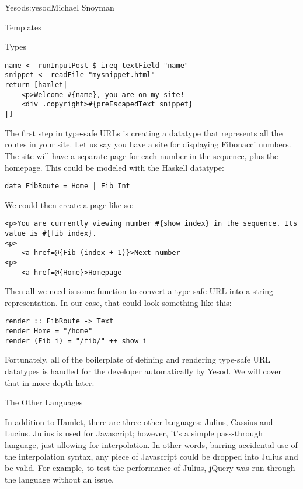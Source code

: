 \begin{aosachapter}{Yesod}{s:yesod}{Michael Snoyman}
\begin{aosasect1}{Templates}
\begin{aosasect2}{Types}
\begin{verbatim}
name <- runInputPost $ ireq textField "name"
snippet <- readFile "mysnippet.html"
return [hamlet|
    <p>Welcome #{name}, you are on my site!
    <div .copyright>#{preEscapedText snippet}
|]
\end{verbatim}

The first step in type-safe URLs is creating a datatype that
represents all the routes in your site. Let us say you have a site for
displaying Fibonacci numbers. The site will have a separate page for
each number in the sequence, plus the homepage. This could be modeled
with the Haskell datatype:

\begin{verbatim}
data FibRoute = Home | Fib Int
\end{verbatim}

\noindent We could then create a page like so:

\begin{verbatim}
<p>You are currently viewing number #{show index} in the sequence. Its value is #{fib index}.
<p>
    <a href=@{Fib (index + 1)}>Next number
<p>
    <a href=@{Home}>Homepage
\end{verbatim}

\noindent Then all we need is some function to convert a type-safe URL into a
string representation. In our case, that could look something like
this:

\begin{verbatim}
render :: FibRoute -> Text
render Home = "/home"
render (Fib i) = "/fib/" ++ show i
\end{verbatim}

Fortunately, all of the boilerplate of defining and rendering
type-safe URL datatypes is handled for the developer automatically by
Yesod. We will cover that in more depth later.

\end{aosasect2}

\begin{aosasect2}{The Other Languages}

In addition to Hamlet, there are three other languages: Julius, Cassius 
and Lucius.  Julius is used
for Javascript; however, it's a simple pass-through language, just
allowing for interpolation. In other words, barring accidental use of
the interpolation syntax, any piece of Javascript could be dropped
into Julius and be valid. For example, to test the performance of
Julius, jQuery was run through the language without an issue.


\end{aosasect2}
\end{aosasect1}
\end{aosachapter}
